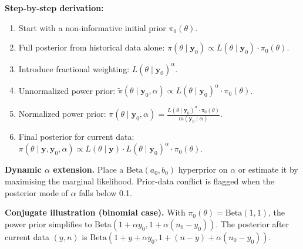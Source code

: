 \documentclass[11pt,a4paper,twoside]{article}
\begin{document}
\textbf{Step-by-step derivation:}
\begin{enumerate}
\item Start with a non-informative initial prior $\pi_0(\theta)$.
\item Full posterior from historical data alone: $\pi(\theta \mid \mathbf{y}_0) \propto L(\theta \mid \mathbf{y}_0) \cdot \pi_0(\theta)$.
\item Introduce fractional weighting: $L(\theta \mid \mathbf{y}_0)^\alpha$.
\item Unnormalized power prior: $\tilde{\pi}(\theta \mid \mathbf{y}_0, \alpha) \propto L(\theta \mid \mathbf{y}_0)^\alpha \cdot \pi_0(\theta)$.
\item Normalized power prior: $\pi(\theta \mid \mathbf{y}_0, \alpha) = \frac{L(\theta \mid \mathbf{y}_0)^\alpha \cdot \pi_0(\theta)}{m(\mathbf{y}_0 \mid \alpha)}$.
\item Final posterior for current data: $\pi(\theta \mid \mathbf{y}, \mathbf{y}_0, \alpha) \propto L(\theta \mid \mathbf{y}) \cdot L(\theta \mid \mathbf{y}_0)^\alpha \cdot \pi_0(\theta)$.
\end{enumerate}

\textbf{Dynamic $\alpha$ extension.} Place a $\text{Beta}(a_0,b_0)$ hyperprior on $\alpha$ or estimate it by maximising the marginal likelihood. Prior-data conflict is flagged when the posterior mode of $\alpha$ falls below 0.1.

\textbf{Conjugate illustration (binomial case).} With $\pi_0(\theta)=\text{Beta}(1,1)$, the power prior simplifies to $\text{Beta}(1+\alpha y_0, 1+\alpha(n_0-y_0))$. The posterior after current data $(y,n)$ is $\text{Beta}(1+y+\alpha y_0, 1+(n-y)+\alpha(n_0-y_0))$.
\end{document}
